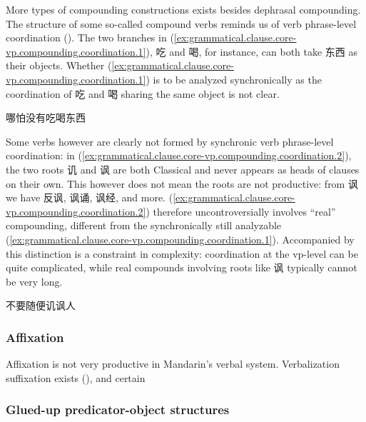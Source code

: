 \documentclass[UTF8, a4paper, oneside, scheme=plain, 12pt]{ctexrep}
\begin{document}
More types of compounding constructions exists besides dephrasal compounding.
The structure of some so-called compound verbs reminds us of verb phrase-level coordination ().
The two branches in (\ref{ex:grammatical.clause.core-vp.compounding.coordination.1}), 吃 and 喝,
for instance, can both take 东西 as their objects.
Whether (\ref{ex:grammatical.clause.core-vp.compounding.coordination.1})
is to be analyzed synchronically as the coordination of 吃 and 喝 sharing the same object is not clear.

\begin{exe}
    \ex\label{ex:grammatical.clause.core-vp.compounding.coordination.1} 哪怕没有吃喝东西
\end{exe}

Some verbs however are clearly not formed by synchronic verb phrase-level coordination:
in (\ref{ex:grammatical.clause.core-vp.compounding.coordination.2}),
the two roots 讥 and 讽 are both Classical and never 
appears as heads of clauses on their own.
This however does not mean the roots are not productive:
from 讽 we have 反讽, 讽诵, 讽经, and more.
(\ref{ex:grammatical.clause.core-vp.compounding.coordination.2}) therefore uncontroversially involves 
``real'' compounding,
different from the synchronically still analyzable (\ref{ex:grammatical.clause.core-vp.compounding.coordination.1}).
Accompanied by this distinction is a constraint in complexity:
coordination at the \ac{vp}-level can be quite complicated,
while real compounds involving roots like 讽 typically cannot be very long.

\begin{exe}
    \ex\label{ex:grammatical.clause.core-vp.compounding.coordination.2} 不要随便讥讽人
\end{exe}

\subsubsection{Affixation}

Affixation is not very productive in Mandarin's verbal system.
Verbalization suffixation exists
(),
and certain 

\begin{exe}
    \ex 
\end{exe}

\subsubsection{Glued-up predicator-object structures}\label{sec:grammatical.clause.core-vp.derivation.glue}
\end{document}
